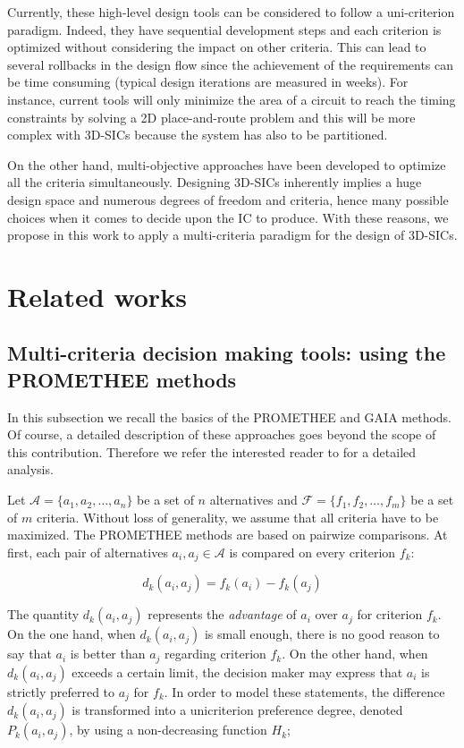 \documentclass{svmono}
\begin{document}
Currently, these high-level design tools can be considered to follow a uni-criterion paradigm. Indeed, they have sequential development steps and each criterion is optimized without considering the impact on other criteria. This can lead to several rollbacks in the design flow since the achievement of the requirements can be time consuming (typical design iterations are measured in weeks). For instance, current tools will only minimize the area of a circuit to reach the timing constraints by solving a 2D place-and-route problem and this will be more complex with 3D-SICs because the system has also to be partitioned.

On the other hand, multi-objective approaches have been developed to optimize all the criteria simultaneously. Designing 3D-SICs inherently implies a huge design space and numerous degrees of freedom and criteria, hence many possible choices when it comes to decide upon the IC to produce. With these reasons, we propose in this work to apply a multi-criteria paradigm for the design of 3D-SICs.

\section{Related works}

\subsection{Multi-criteria decision making tools: using the PROMETHEE methods}

In this subsection we recall the basics of the PROMETHEE and GAIA methods. Of course, a detailed description of these approaches goes beyond the scope of this contribution. Therefore we refer the interested reader to \cite{BraMar2005} for a detailed analysis.

Let $\mathcal{A}=\{a_1,a_2,\ldots,a_n\}$ be a set of $n$ alternatives and $\mathcal{F}=\{f_1,f_2,\ldots,f_m\}$ be a set of $m$ criteria. Without loss of generality, we assume that all criteria have to be maximized. The PROMETHEE methods are based on pairwize comparisons. At first, each pair of alternatives $a_i,a_j \in \mathcal{A}$ is compared on every criterion $f_k$:

$$
d_k(a_i,a_j) = f_k(a_i) - f_k(a_j)
$$

The quantity $d_k(a_i,a_j)$ represents the \textit{advantage} of $a_i$ over $a_j$ for criterion $f_k$. On the one hand, when $d_k(a_i,a_j)$ is small enough, there is no good reason to say that $a_i$ is better than $a_j$ regarding criterion $f_k$. On the other hand, when $d_k(a_i,a_j)$ exceeds a certain limit, the decision maker may express that $a_i$ is strictly preferred to $a_j$ for $f_k$. In order to model these statements, the difference $d_k(a_i,a_j)$ is transformed into a unicriterion preference degree, denoted $ P_k(a_i,a_j)$, by using a non-decreasing function $H_k$;
\end{document}
